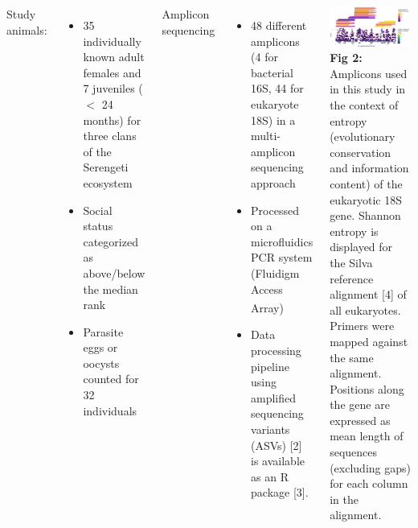 \documentclass[30pt, a0paper, portrait, margin=0mm, innermargin=15mm,
               blockverticalspace=15mm, colspace=15mm, subcolspace=8mm]{tikzposter}
\begin{document}
\begin{columns}
{\begin{minipage}{0.5\linewidth}
\end{minipage} 
\hfill
}
      {
        Study animals:
        \begin{itemize}
        \item 35 individually known adult females and 7 juveniles ($<$
          24 months) for three clans of the Serengeti ecosystem
        \item Social status categorized as above/below the median rank
        \item Parasite eggs or oocysts counted for 32 individuals
        \end{itemize}
        Amplicon sequencing
        \begin{itemize}
        \item{48 different amplicons (4 for bacterial 16S, 44 for
          eukaryote 18S) in a multi-amplicon sequencing approach}
        \item{Processed on a microfluidics PCR system (Fluidigm Access
          Array\textsuperscript{\textregistered})}
        \item{Data processing pipeline using amplified sequencing
          variants (ASVs) [2] is available as an R package [3].}
        \end{itemize}
        \includegraphics[width=1\linewidth]{entropy_primers_norm_woName.png}
        \textbf{Fig 2:} Amplicons used in this study in the context of
        entropy (evolutionary conservation and information content) of
        the eukaryotic 18S gene. Shannon entropy is displayed for the
        Silva reference alignment [4] of all eukaryotes. Primers were
        mapped against the same alignment. Positions along the gene
        are expressed as mean length of sequences (excluding gaps) for
        each column in the alignment.}
      

\end{columns}
\end{document}
